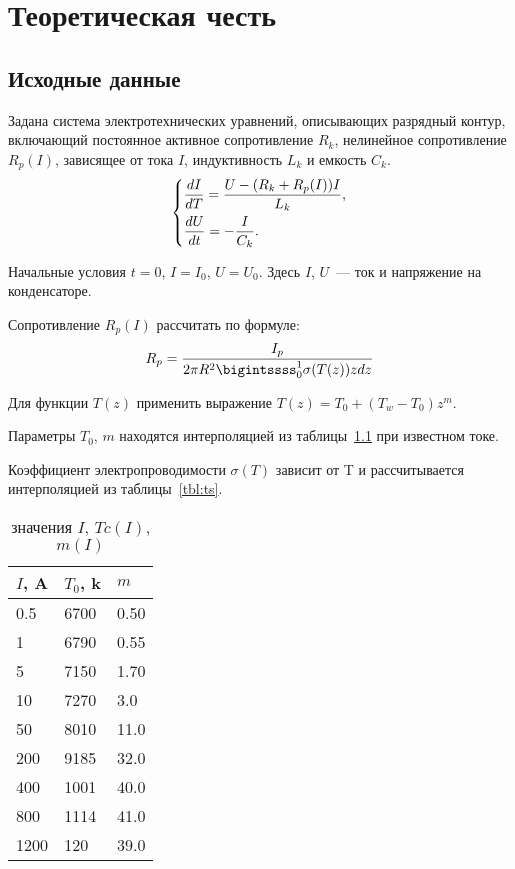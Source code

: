 \chapter{Теоретическая честь}

\section{Исходные данные}
Задана система электротехнических уравнений, описывающих разрядный контур, включающий постоянное активное сопротивление $R_k$, нелинейное сопротивление $R_p(I)$, зависящее от тока $I$,  индуктивность $L_k$ и емкость $C_k$.
\begin{equation*}
\begin{dcases}
    \frac{dI}{dT} = \frac{U - (R_k + R_p(I))I}{L_k}, \\
    \frac{dU}{dt} = -\frac{I}{C_k}. \\
\end{dcases}
\end{equation*}

Начальные условия $t = 0$, $I = I_0$, $U = U_0$. Здесь $I$, $U$~--- ток и напряжение на конденсаторе.

Сопротивление $R_p(I)$ рассчитать по формуле:
\begin{equation*}
    R_p = \frac{I_p}{2 \pi R^2 \bigintssss_{0}^{1} \sigma (T(z)) z dz}
\end{equation*}

Для функции $T(z)$ применить выражение $T(z) = T_0 + (T_w - T_0)z^m$.

Параметры $T_0$, $m$ находятся интерполяцией из таблицы~\ref{tbl:itm} при известном токе.

Коэффициент электропроводимости $\sigma(T)$ зависит от T и рассчитывается интерполяцией из таблицы~\ref{tbl:ts}.

\begin{table}[H]
    \centering
    \caption{значения $I$, $Tc(I)$, $m(I)$}\label{tbl:itm}
    \begin{tabular}{|l|l|l|}
        \hline
        $I$, A & $T_0$, k & $m$ \\
        \hline
        0.5  & 6700 &  0.50 \\
        \hline
        1    & 6790 &  0.55 \\
        \hline
        5    & 7150 &  1.70 \\
        \hline
        10   & 7270 &  3.0  \\
        \hline
        50   & 8010 &  11.0 \\
        \hline
        200  & 9185 &  32.0 \\
        \hline
        400  & 1001 &  40.0 \\
        \hline
        800  & 1114 &  41.0 \\
        \hline
        1200 & 120  &  39.0 \\
        \hline
    \end{tabular}
\end{table}

